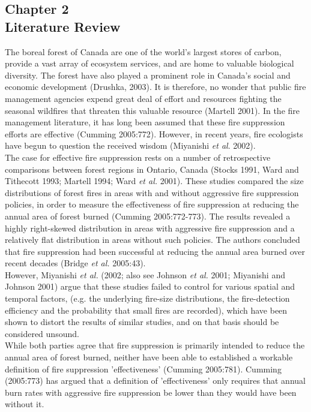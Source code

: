 \documentclass{article}
\begin{document}


\begin{spacing}{1.5}
\phantom
\phantom
\section*{Chapter 2 \\ \huge{Literature Review}}
\phantom
\phantom
The boreal forest of Canada are one of the world's largest stores of carbon, provide a vast array of ecosystem services, and are home to valuable biological diversity. The forest have also played a prominent role in Canada's social and economic development (Drushka, 2003). It is therefore, no wonder that public fire management agencies expend great deal of effort and resources fighting the seasonal wildfires that threaten this valuable resource (Martell 2001). In the fire management literature, it has long been assumed that these fire suppression efforts are effective (Cumming 2005:772). However, in recent years, fire ecologists have begun to question the received wisdom (Miyanishi {\it et al}. 2002). \\

The case for effective fire suppression rests on a number of retrospective comparisons between forest regions in Ontario, Canada (Stocks 1991, Ward and Tithecott 1993; Martell 1994; Ward {\it et al.} 2001). These studies compared the size distributions of forest fires in areas with and without aggressive fire suppression policies, in order to measure the effectiveness of fire suppression at reducing the annual area of forest burned (Cumming 2005:772-773). The results revealed a highly right-skewed distribution in areas with aggressive fire suppression and a relatively flat distribution in areas without such policies. The authors concluded that fire suppression had been successful at reducing the annual area burned over recent decades (Bridge {\it et al.} 2005:43). \\

However, Miyanishi {\it et al.} (2002; also see Johnson {\it et al.} 2001; Miyanishi and Johnson 2001) argue that these studies failed to control for various spatial and temporal factors, (e.g. the underlying fire-size distributions, the fire-detection efficiency and the probability that small fires are recorded), which have been shown to distort the results of similar studies, and on that basis should be considered unsound. \\

While both parties agree that fire suppression is primarily intended to reduce the annual area of forest burned, neither have been able to established a workable definition of fire suppression 'effectiveness' (Cumming 2005:781). Cumming (2005:773) has argued that a definition of 'effectiveness' only requires that annual burn rates with aggressive fire suppression be lower than they would have been without it. \\


\end{spacing}
\end{document}
